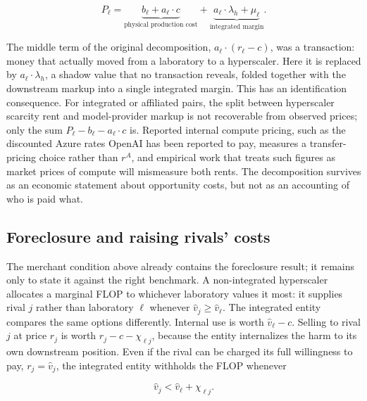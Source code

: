 \documentclass[11pt]{article}
\begin{document}
\begin{equation}P_\ell=\underbrace{b_\ell+a_\ell\cdot c}_{\text{physical production cost}}+\underbrace{a_\ell\cdot\lambda_h+\mu_\ell}_{\text{integrated margin}}.\end{equation}

The middle term of the original decomposition, $a_\ell\cdot(r_\ell-c)$, was a transaction: money that actually moved from a laboratory to a hyperscaler. Here it is replaced by $a_\ell\cdot\lambda_h$, a shadow value that no transaction reveals, folded together with the downstream markup into a single integrated margin. This has an identification consequence. For integrated or affiliated pairs, the split between hyperscaler scarcity rent and model-provider markup is not recoverable from observed prices; only the sum $P_\ell-b_\ell-a_\ell\cdot c$ is. Reported internal compute pricing, such as the discounted Azure rates OpenAI has been reported to pay, measures a transfer-pricing choice rather than $r^A$, and empirical work that treats such figures as market prices of compute will mismeasure both rents. The decomposition survives as an economic statement about opportunity costs, but not as an accounting of who is paid what.

\subsection{Foreclosure and raising rivals' costs}
\label{sec:integration-foreclosure}

The merchant condition above already contains the foreclosure result; it remains only to state it against the right benchmark. A non-integrated hyperscaler allocates a marginal FLOP to whichever laboratory values it most: it supplies rival $j$ rather than laboratory $\ell$ whenever $\widehat v_j\geq\widehat v_\ell$. The integrated entity compares the same options differently. Internal use is worth $\widehat v_\ell-c$. Selling to rival $j$ at price $r_j$ is worth $r_j-c-\chi_{\ell j}$, because the entity internalizes the harm to its own downstream position. Even if the rival can be charged its full willingness to pay, $r_j=\widehat v_j$, the integrated entity withholds the FLOP whenever

\begin{equation}\boxed{\widehat v_j<\widehat v_\ell+\chi_{\ell j}.}\end{equation}
\end{document}
